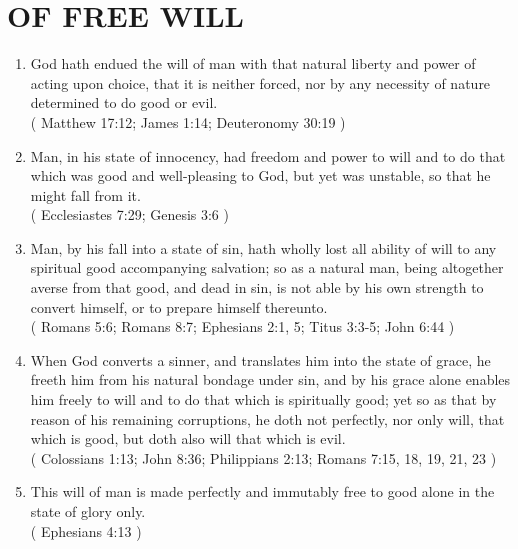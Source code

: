 \documentclass[12pt,a4paper]{book}
\begin{document}
\chapter{OF FREE WILL}
\label{ch-fre-wil}
\begin{enumerate}
\item
\label{ch-fre-wil-1}
God hath endued the will of man with that natural liberty and power of acting upon choice, that it is neither forced, nor by any necessity of nature determined to do good or evil.\\
( Matthew 17:12; James 1:14; Deuteronomy 30:19 )
\item
\label{ch-fre-wil-2}
Man, in his state of innocency, had freedom and power to will and to do that which was good and well-pleasing to God, but yet was unstable, so that he might fall from it.\\
( Ecclesiastes 7:29; Genesis 3:6 )
\item
\label{ch-fre-wil-3}
Man, by his fall into a state of sin, hath wholly lost all ability of will to any spiritual good accompanying salvation; so as a natural man, being altogether averse from that good, and dead in sin, is not able by his own strength to convert himself, or to prepare himself thereunto.\\
( Romans 5:6; Romans 8:7; Ephesians 2:1, 5; Titus 3:3-5; John 6:44 )
\item
\label{ch-fre-wil-4}
When God converts a sinner, and translates him into the state of grace, he freeth him from his natural bondage under sin, and by his grace alone enables him freely to will and to do that which is spiritually good; yet so as that by reason of his remaining corruptions, he doth not perfectly, nor only will, that which is good, but doth also will that which is evil.\\
( Colossians 1:13; John 8:36; Philippians 2:13; Romans 7:15, 18, 19, 21, 23 )
\item
\label{ch-fre-wil-5}
This will of man is made perfectly and immutably free to good alone in the state of glory only.\\
( Ephesians 4:13 )
\end{enumerate}
\end{document}
